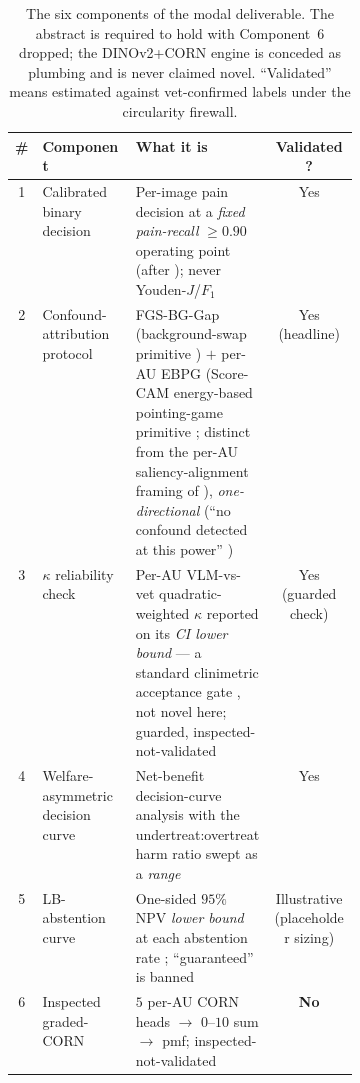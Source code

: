 \begin{table}[t]
\centering
\caption[The six components of the modal deliverable]{The six components of the
modal deliverable. The abstract is required to hold with Component~6 dropped; the
DINOv2+CORN engine is conceded as plumbing and is never claimed novel. ``Validated''
means estimated against vet-confirmed labels under the circularity firewall.}
\label{tab:modal-components}
\small
\begin{tabular}{@{}clp{0.40\linewidth}c@{}}
\toprule
\# & Component & What it is & Validated? \\
\midrule
1 & Calibrated binary decision &
  Per-image pain decision at a \emph{fixed pain-recall} $\geq 0.90$ operating
  point (after \citealp{evangelista2019}); never Youden-$J$/$F_1$ & Yes \\
2 & Confound-attribution protocol &
  FGS-BG-Gap (background-swap primitive \citep{xiao2021noise,moayeri2022comprehensive})
  $+$ per-AU EBPG (Score-CAM energy-based pointing-game primitive
  \citep{wang2020scorecam}; distinct from the per-AU saliency-alignment framing of
  \citet{lencioni2025segment}), \emph{one-directional} (``no confound detected at
  this power'' \citep{adebayo2022posthoc}) & Yes (headline) \\
3 & $\kappa$ reliability check &
  Per-AU VLM-vs-vet quadratic-weighted $\kappa$ \citep{cohen1968kappa} reported on
  its \emph{CI lower bound} --- a standard clinimetric acceptance gate
  \citep{tractenberg2010kappa,donner2010kappa,rotondi2012kappa,rotondi2018kappasize,simwright2005kappa},
  not novel here; guarded, inspected-not-validated & Yes (guarded check) \\
4 & Welfare-asymmetric decision curve &
  Net-benefit decision-curve analysis \citep{vickers2006dca} with the
  undertreat:overtreat harm ratio swept as a \emph{range} & Yes \\
5 & LB-abstention curve &
  One-sided $95\%$ NPV \emph{lower bound} at each abstention rate
  \citep{angelopoulos2021ltt}; ``guaranteed'' is banned & Illustrative (placeholder sizing) \\
6 & Inspected graded-CORN &
  $5$ per-AU CORN heads \citep{shi2023corn} $\to$ $0$--$10$ sum $\to$ pmf;
  inspected-not-validated & \textbf{No} \\
\bottomrule
\end{tabular}
\end{table}

